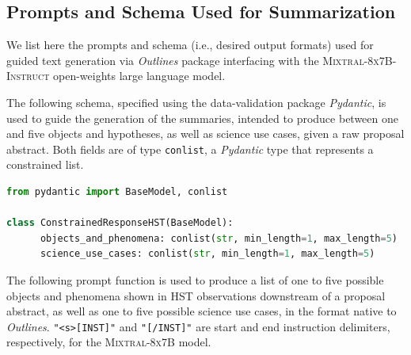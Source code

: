 \documentclass{article} %
\newcommand{\package}[1]{\textsl{#1}\xspace}
\begin{document}
\subsection{Prompts and Schema Used for Summarization}
\label{app:summarization}

We list here the prompts and schema (i.e., desired output formats) used for guided text generation via \package{Outlines} package interfacing with the \textsc{Mixtral-8x7B-Instruct} open-weights large language model.

The following schema, specified using the data-validation package \package{Pydantic}, is used to guide the generation of the summaries, intended to produce between one and five objects and hypotheses, as well as science use cases, given a raw proposal abstract. Both fields are of type \texttt{conlist}, a \package{Pydantic} type that represents a constrained list.  \\

\begin{lstlisting}[language=Python]
from pydantic import BaseModel, conlist

class ConstrainedResponseHST(BaseModel):
      objects_and_phenomena: conlist(str, min_length=1, max_length=5)
      science_use_cases: conlist(str, min_length=1, max_length=5)
\end{lstlisting}

The following prompt function is used to produce a list of one to five possible objects and phenomena shown in HST observations downstream of a proposal abstract, as well as one to five possible science use cases, in the format native to \package{Outlines}. \textcolor{deepgreen}{\lstinline{"<s>[INST]"}} and \textcolor{deepgreen}{\lstinline{"[/INST]"}} are start and end instruction delimiters, respectively, for the \textsc{Mixtral-8x7B} model.\\
\end{document}
